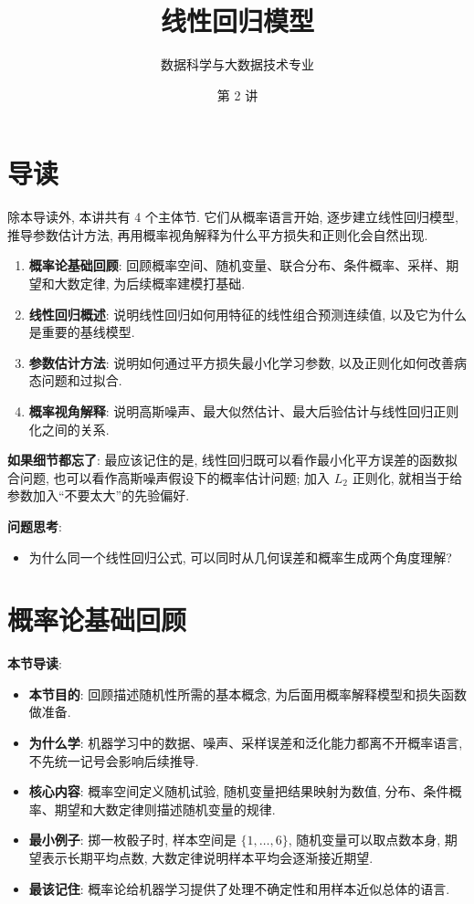 \documentclass{../nndlcourse}
\begin{document}
\title{线性回归模型}
\author{数据科学与大数据技术专业}
\date{第 2 讲 }
\maketitle

\section{导读}

除本导读外, 本讲共有 4 个主体节. 它们从概率语言开始, 逐步建立线性回归模型, 推导参数估计方法, 再用概率视角解释为什么平方损失和正则化会自然出现.

\begin{enumerate}
  \item \textbf{概率论基础回顾}: 回顾概率空间、随机变量、联合分布、条件概率、采样、期望和大数定律, 为后续概率建模打基础.
  \item \textbf{线性回归概述}: 说明线性回归如何用特征的线性组合预测连续值, 以及它为什么是重要的基线模型.
  \item \textbf{参数估计方法}: 说明如何通过平方损失最小化学习参数, 以及正则化如何改善病态问题和过拟合.
  \item \textbf{概率视角解释}: 说明高斯噪声、最大似然估计、最大后验估计与线性回归正则化之间的关系.
\end{enumerate}

\textbf{如果细节都忘了}: 最应该记住的是, 线性回归既可以看作最小化平方误差的函数拟合问题, 也可以看作高斯噪声假设下的概率估计问题; 加入 $L_2$ 正则化, 就相当于给参数加入“不要太大”的先验偏好.

\textbf{问题思考}:

\begin{itemize}
  \item 为什么同一个线性回归公式, 可以同时从几何误差和概率生成两个角度理解?
\end{itemize}

\section{概率论基础回顾}

\textbf{本节导读}:
\begin{itemize}
  \item \textbf{本节目的}: 回顾描述随机性所需的基本概念, 为后面用概率解释模型和损失函数做准备.
  \item \textbf{为什么学}: 机器学习中的数据、噪声、采样误差和泛化能力都离不开概率语言, 不先统一记号会影响后续推导.
  \item \textbf{核心内容}: 概率空间定义随机试验, 随机变量把结果映射为数值, 分布、条件概率、期望和大数定律则描述随机变量的规律.
  \item \textbf{最小例子}: 掷一枚骰子时, 样本空间是 $\{1,\ldots,6\}$, 随机变量可以取点数本身, 期望表示长期平均点数, 大数定律说明样本平均会逐渐接近期望.
  \item \textbf{最该记住}: 概率论给机器学习提供了处理不确定性和用样本近似总体的语言.
\end{itemize}
\end{document}
